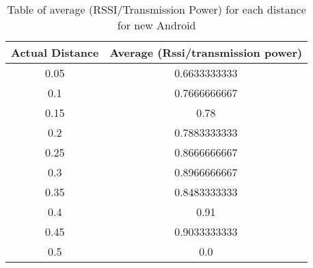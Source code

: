 \begin{table}[H]
\label{tableOfRssiNewAndroid}
\begin{tabular}{|c|c|}
\hline 
Actual Distance & Average (Rssi/transmission power)\tabularnewline
\hline 
\hline 
0.05 & 0.6633333333\tabularnewline
\hline 
0.1 & 0.7666666667\tabularnewline
\hline 
0.15 & 0.78\tabularnewline
\hline 
0.2 & 0.7883333333\tabularnewline
\hline 
0.25 & 0.8666666667\tabularnewline
\hline 
0.3 & 0.8966666667\tabularnewline
\hline 
0.35 &  0.8483333333\tabularnewline
\hline 
0.4 & 0.91\tabularnewline
\hline 
0.45 & 0.9033333333\tabularnewline
\hline 
0.5 & 0.0\tabularnewline
\hline 
\end{tabular}

\protect\caption{Table of average (RSSI/Transmission Power) for each distance for new Android}
\end{table}